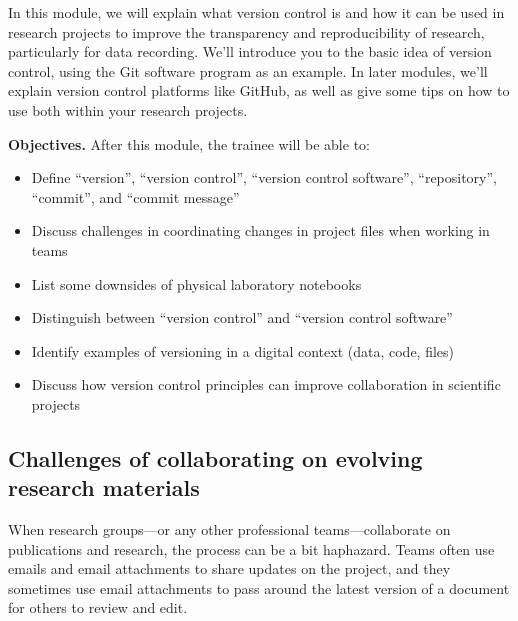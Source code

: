 \documentclass[]{tufte-book}
\providecommand{\tightlist}{%
  \setlength{\itemsep}{0pt}\setlength{\parskip}{0pt}}
\begin{document}
In this module, we will explain what version control is and how it can be used
in research projects to improve the transparency and reproducibility of
research, particularly for data recording. We'll introduce you
to the basic idea of version control, using the Git software program as an
example. In later modules, we'll explain version control platforms like GitHub,
as well as give some tips on how to use both within your research projects.

\textbf{Objectives.} After this module, the trainee will be able to:

\begin{itemize}
\tightlist
\item
  Define ``version'', ``version control'', ``version control software'',
  ``repository'', ``commit'', and ``commit message''
\item
  Discuss challenges in coordinating changes in project files when working
  in teams
\item
  List some downsides of physical laboratory notebooks
\item
  Distinguish between ``version control'' and ``version control software''
\item
  Identify examples of versioning in a digital context (data, code, files)
\item
  Discuss how version control principles can improve collaboration in
  scientific projects
\end{itemize}

\subsection{Challenges of collaborating on evolving research materials}\label{challenges-of-collaborating-on-evolving-research-materials}

When research groups---or any other professional teams---collaborate on
publications and research, the process can be a bit haphazard. Teams often use
emails and email attachments to share updates on the project, and they sometimes
use email attachments to pass around the latest version of a document for others
to review and edit.
\end{document}
